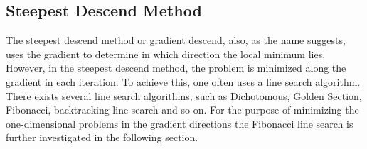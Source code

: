 \subsection{Steepest Descend Method}
The steepest descend method or gradient descend, also, as the name suggests, uses the gradient to determine in which direction the local minimum lies. However, in the steepest descend method, the problem is minimized along the gradient in each iteration. To achieve this, one often uses a line search algorithm. There exists several line search algorithms, such as Dichotomous, Golden Section, Fibonacci, backtracking line search and so on. For the purpose of minimizing the one-dimensional problems in the gradient directions the Fibonacci line search is further investigated in the following section.
